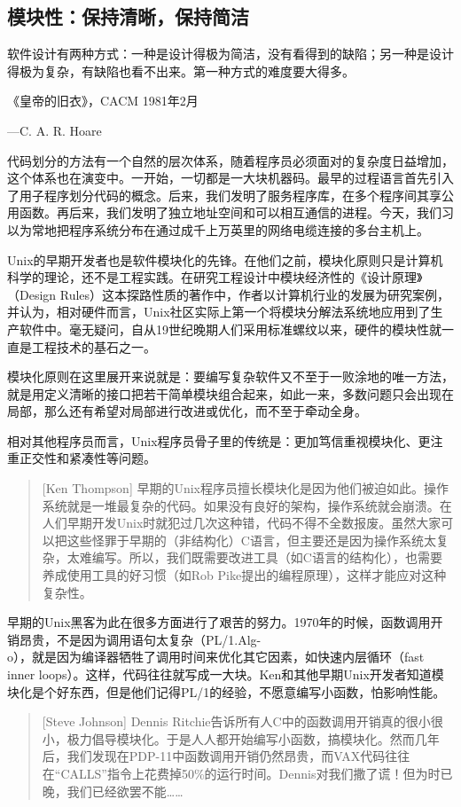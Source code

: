 \documentclass[12pt,oneside]{book}
\begin{document}
\begin{common-format}
\chapter{模块性：保持清晰，保持简洁}
\begin{flushright}
\begin{notecard}{30em}
软件设计有两种方式：一种是设计得极为简洁，没有看得到的缺陷；另一种是设计得极为复杂，有缺陷也看不出来。第一种方式的难度要大得多。

{\hfill 《皇帝的旧衣》，CACM 1981年2月}

{\hfill —C. A. R. Hoare}
\end{notecard}
\end{flushright}

代码划分的方法有一个自然的层次体系，随着程序员必须面对的复杂度日益增加，这个体系也在演变中。一开始，一切都是一大块机器码。最早的过程语言首先引入了用子程序划分代码的概念。后来，我们发明了服务程序库，在多个程序间其享公用函数。再后来，我们发明了独立地址空间和可以相互通信的进程。今天，我们习以为常地把程序系统分布在通过成千上万英里的网络电缆连接的多台主机上。

Unix的早期开发者也是软件模块化的先锋。在他们之前，模块化原则只是计算机科学的理论，还不是工程实践。在研究工程设计中模块经济性的《设计原理》（Design Rules）\cite{Baldwin-Clark}这本探路性质的著作中，作者以计算机行业的发展为研究案例，并认为，相对硬件而言，Unix社区实际上第一个将模块分解法系统地应用到了生产软件中。毫无疑问，自从19世纪晚期人们采用标准螺纹以来，硬件的模块性就一直是工程技术的基石之一。

模块化原则在这里展开来说就是：要编写复杂软件又不至于一败涂地的唯一方法，就是用定义清晰的接口把若干简单模块组合起来，如此一来，多数问题只会出现在局部，那么还有希望对局部进行改进或优化，而不至于牵动全身。

相对其他程序员而言，Unix程序员骨子里的传统是：更加笃信重视模块化、更注重正交性和紧凑性等问题。
\begin{quote}[Ken Thompson]
早期的Unix程序员擅长模块化是因为他们被迫如此。操作系统就是一堆最复杂的代码。如果没有良好的架构，操作系统就会崩溃。在人们早期开发Unix时就犯过几次这种错，代码不得不全数报废。虽然大家可以把这些怪罪于早期的（非结构化）C语言，但主要还是因为操作系统太复杂，太难编写。所以，我们既需要改进工具（如C语言的结构化），也需要养成使用工具的好习惯（如Rob Pike提出的编程原理），这样才能应对这种复杂性。
\end{quote}

早期的Unix黑客为此在很多方面进行了艰苦的努力。1970年的时候，函数调用开销昂贵，不是因为调用语句太复杂（PL/1.Alg-\\o），就是因为编译器牺牲了调用时间来优化其它因素，如快速内层循环（fast inner loops）。这样，代码往往就写成一大块。Ken和其他早期Unix开发者知道模块化是个好东西，但是他们记得PL/1的经验，不愿意编写小函数，怕影响性能。
\begin{quote}[Steve Johnson]
Dennis Ritchie告诉所有人C中的函数调用开销真的很小很小，极力倡导模块化。于是人人都开始编写小函数，搞模块化。然而几年后，我们发现在PDP-11中函数调用开销仍然昂贵，而VAX代码往往在“CALLS”指令上花费掉50\%的运行时间。Dennis对我们撒了谎！但为时已晚，我们已经欲罢不能……
\end{quote}


\end{common-format}
\end{document}
